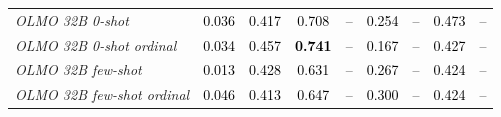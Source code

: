 \begin{table}[!htbp]
{\begin{tabular}{lcccccccc}
\textit{OLMO 32B 0-shot} & \textcolor{black}{0.036} & \textcolor{black}{0.417} & \textcolor{black}{0.708} & \textcolor{black}{--} & \textcolor{black}{0.254} & \textcolor{black}{--} & \textcolor{black}{0.473} & \textcolor{black}{--} \\
\textit{OLMO 32B 0-shot ordinal} & \textcolor{black}{0.034} & \textcolor{black}{0.457} & \textcolor{black}{\textbf{0.741}} & \textcolor{black}{--} & \textcolor{black}{0.167} & \textcolor{black}{--} & \textcolor{black}{0.427} & \textcolor{black}{--} \\
\textit{OLMO 32B few-shot} & \textcolor{black}{0.013} & \textcolor{black}{0.428} & \textcolor{black}{0.631} & \textcolor{black}{--} & \textcolor{black}{0.267} & \textcolor{black}{--} & \textcolor{black}{0.424} & \textcolor{black}{--} \\
\textit{OLMO 32B few-shot ordinal} & \textcolor{black}{0.046} & \textcolor{black}{0.413} & \textcolor{black}{0.647} & \textcolor{black}{--} & \textcolor{black}{0.300} & \textcolor{black}{--} & \textcolor{black}{0.424} & \textcolor{black}{--} \\


\end{tabular}}
\end{table}
